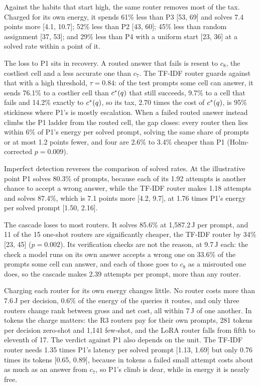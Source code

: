 Against the habits that start high, the same router removes most of the tax.
Charged for its own energy, it spends 61\% less than P3 [53, 69] and solves
7.4 points more [4.1, 10.7]; 52\% less than P2 [43, 60]; 45\% less than
random assignment [37, 53]; and 29\% less than P4 with a uniform start [23,
36] at a solved rate within a point of it.

The loss to P1 sits in recovery. A routed answer that fails is resent to
$c_8$, the costliest cell and a less accurate one than $c_7$. The TF-IDF
router guards against that with a high threshold, $\tau = 0.84$: of the test
prompts some cell can answer, it sends 76.1\% to a costlier cell than
$c^{*}(q)$ that still succeeds, 9.7\% to a cell that fails and 14.2\%
exactly to $c^{*}(q)$, so its tax, 2.70 times the cost of $c^{*}(q)$, is
95\% stickiness where P1's is mostly escalation. When a failed routed answer
instead climbs the P1 ladder from the routed cell, the gap closes: every
router then lies within 6\% of P1's energy per solved prompt, solving the
same share of prompts or at most 1.2 points fewer, and four are 2.6\% to
3.4\% cheaper than P1 (Holm-corrected $p = 0.009$).

Imperfect detection reverses the comparison of solved rates. At the
illustrative point P1 solves 80.3\% of prompts, because each of its 1.92
attempts is another chance to accept a wrong answer, while the TF-IDF router
makes 1.18 attempts and solves 87.4\%, which is 7.1 points more [4.2, 9.7],
at 1.76 times P1's energy per solved prompt [1.50, 2.16].

The cascade loses to most routers. It solves 85.6\% at 1{,}587.2\,J per
prompt, and 11 of the 15 one-shot routers are significantly cheaper, the
TF-IDF router by 34\% [23, 45] ($p = 0.002$). Its verification checks are not
the reason, at 9.7\,J each: the check a model runs on its own answer accepts
a wrong one on 33.6\% of the prompts some cell can answer, and each of those
goes to $c_8$ as a misrouted one does, so the cascade makes 2.39 attempts per
prompt, more than any router.

Charging each router for its own energy changes little. No router costs more
than 7.6\,J per decision, 0.6\% of the energy of the queries it routes, and
only three routers change rank between gross and net cost, all within 7\,J of
one another. In tokens the charge matters: the R3 routers pay for their own
prompts, 281 tokens per decision zero-shot and 1{,}141 few-shot, and the LoRA
router falls from fifth to eleventh of 17. The verdict against P1 also
depends on the unit. The TF-IDF router needs 1.35 times P1's latency per
solved prompt [1.13, 1.69] but only 0.76 times its tokens [0.65, 0.89],
because in tokens a failed small attempt costs about as much as an answer
from $c_7$, so P1's climb is dear, while in energy it is nearly free.

